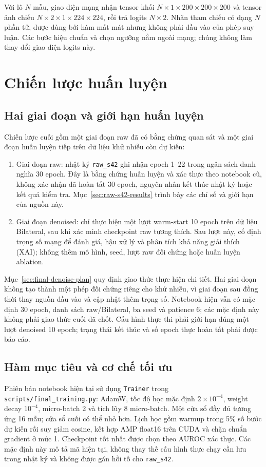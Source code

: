 \documentclass[14pt,a4paper,oneside]{extreport}
\begin{document}
Với lô $N$ mẫu, giao diện mạng nhận tensor khối
$N\times1\times200\times200\times200$ và tensor ảnh chiếu
$N\times2\times1\times224\times224$, rồi trả logits $N\times2$.
Nhãn tham chiếu có dạng $N$ phần tử, được dùng bởi hàm mất mát nhưng
không phải đầu vào của phép suy luận. Các bước hiệu chuẩn và chọn
ngưỡng nằm ngoài mạng; chúng không làm thay đổi giao diện logits này.

\section{Chiến lược huấn luyện}
\subsection{Hai giai đoạn và giới hạn huấn luyện}
Chiến lược cuối gồm một giai đoạn raw đã có bằng chứng quan sát và
một giai đoạn huấn luyện tiếp trên dữ liệu khử nhiễu còn dự kiến:
\begin{enumerate}[label=\arabic*.,leftmargin=1cm]
 \item Giai đoạn raw: nhật ký \texttt{raw\_s42} ghi nhận epoch 1--22
 trong ngân sách danh nghĩa 30 epoch. Đây là bằng chứng huấn luyện
 và xác thực theo notebook cũ, không xác nhận đã hoàn tất 30 epoch,
 nguyên nhân kết thúc nhật ký hoặc kết quả kiểm tra.
 Mục~\ref{sec:raw-s42-results} trình bày các chỉ số và giới hạn của nguồn này.
 \item Giai đoạn denoised: chỉ thực hiện một lượt warm-start 10 epoch
 trên dữ liệu Bilateral, sau khi xác minh checkpoint raw tương thích.
 Sau lượt này, cố định trọng số mạng để đánh giá, hậu xử lý và phân
 tích khả năng giải thích (XAI); không thêm mô hình, seed, lượt raw
 đối chứng hoặc huấn luyện ablation.
\end{enumerate}
Mục~\ref{sec:final-denoise-plan} quy định giao thức thực hiện chi tiết.
Hai giai đoạn không tạo thành một phép đối chứng riêng cho khử nhiễu,
vì giai đoạn sau đồng thời thay nguồn đầu vào và cập nhật thêm trọng số.
Notebook hiện vẫn có mặc định 30 epoch, danh sách raw/Bilateral, ba seed
và patience 6; các mặc định này không phải giao thức cuối đã chốt.
Cấu hình thực thi phải giới hạn đúng một lượt denoised 10 epoch;
trạng thái kết thúc và số epoch thực hoàn tất phải được báo cáo.

\subsection{Hàm mục tiêu và cơ chế tối ưu}
Phiên bản notebook hiện tại sử dụng \texttt{Trainer} trong
\texttt{scripts/final\_training.py}: AdamW, tốc độ học mặc định
$2\times10^{-4}$, weight decay $10^{-4}$, micro-batch 2 và tích lũy
8 micro-batch. Một cửa sổ đầy đủ tương ứng 16 mẫu; cửa sổ cuối có thể
nhỏ hơn. Lịch học gồm warmup trong 5\% số bước dự kiến rồi suy giảm
cosine, kết hợp AMP float16 trên CUDA và chặn chuẩn gradient ở mức 1.
Checkpoint tốt nhất được chọn theo AUROC xác thực. Các mặc định này
mô tả mã hiện tại, không thay thế cấu hình thực chạy cần lưu trong
nhật ký và không được gán hồi tố cho \texttt{raw\_s42}.
\end{document}
